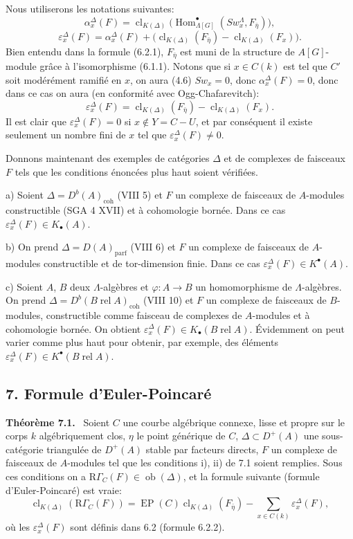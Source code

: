 \documentclass[11pt]{article}
\newenvironment{statement}[1]{\par\medskip\noindent\textbf{#1.}\ }{\par\medskip}
\DeclareMathOperator{\Hom}{Hom}
\providecommand{\EP}{\operatorname{EP}}
\providecommand{\parf}{\mathrm{parf}}
\providecommand{\coh}{\mathrm{coh}}
\providecommand{\Ob}{\operatorname{ob}}
\providecommand{\Hom}{\operatorname{Hom}}
\providecommand{\Ob}{\operatorname{ob}}
\providecommand{\EP}{\operatorname{EP}}
\providecommand{\Ob}{\operatorname{Ob}}
\providecommand{\parf}{\mathrm{parf}}
\providecommand{\coh}{\mathrm{coh}}
\providecommand{\clK}[1]{\operatorname{cl}_{K(#1)}}
\providecommand{\RG}{\mathrm R\Gamma}
\providecommand{\Hom}{\operatorname{Hom}}
\providecommand{\Ob}{\operatorname{ob}}
\providecommand{\Ob}{\operatorname{Ob}}
\begin{document}
Nous utiliserons les notations suivantes:
\[
\alpha_x^\Delta(F)
=
\clK{\Delta}\bigl(\Hom^\bullet_{\Lambda[G]}(Sw_x^\Lambda,F_{\bar\eta})\bigr),
\tag{6.2.1}
\]
\[
\varepsilon_x^\Delta(F)
=
\alpha_x^\Delta(F)+
\bigl(\clK{\Delta}(F_{\bar\eta})-\clK{\Delta}(F_x)\bigr).
\tag{6.2.2}
\]
Bien entendu dans la formule (6.2.1), $F_{\bar\eta}$ est muni de la structure de $A[G]$-module grâce à l'isomorphisme (6.1.1). Notons que si $x\in C(k)$ est tel que $C'$ soit modérément ramifié en $x$, on aura (4.6) $Sw_x=0$, donc $\alpha_x^\Delta(F)=0$, donc dans ce cas on aura (en conformité avec Ogg-Chafarevitch):
\[
\varepsilon_x^\Delta(F)=\clK{\Delta}(F_{\bar\eta})-\clK{\Delta}(F_x).
\tag{6.2.3}
\]
Il est clair que $\varepsilon_x^\Delta(F)=0$ si $x\notin Y=C-U$, et par conséquent il existe seulement un nombre fini de $x$ tel que $\varepsilon_x^\Delta(F)\ne0$.

Donnons maintenant des exemples de catégories $\Delta$ et de complexes de faisceaux $F$ tels que les conditions énoncées plus haut soient vérifiées.

a) Soient $\Delta=D^b(A)_{\coh}$ (VIII 5) et $F$ un complexe de faisceaux de $A$-modules constructible (SGA 4 XVII) et à cohomologie bornée. Dans ce cas $\varepsilon_x^\Delta(F)\in K_\bullet(A)$.

b) On prend $\Delta=D(A)_{\parf}$ (VIII 6) et $F$ un complexe de faisceaux de $A$-modules constructible et de tor-dimension finie. Dans ce cas $\varepsilon_x^\Delta(F)\in K^{\bullet}(A)$.

c) Soient $A$, $B$ deux $\Lambda$-algèbres et $\varphi:A\to B$ un homomorphisme de $\Lambda$-algèbres. On prend $\Delta=D^b(B\operatorname{ rel }A)_{\coh}$ (VIII 10) et $F$ un complexe de faisceaux de $B$-modules, constructible comme faisceau de complexes de $A$-modules et à cohomologie bornée. On obtient $\varepsilon_x^\Delta(F)\in K_\bullet(B\operatorname{ rel }A)$. Évidemment on peut varier comme plus haut pour obtenir, par exemple, des éléments $\varepsilon_x^\Delta(F)\in K^{\bullet}(B\operatorname{ rel }A)$.

\subsection*{7. Formule d'Euler-Poincaré}

\begin{statement}{Théorème 7.1}
Soient $C$ une courbe algébrique connexe, lisse et propre sur le corps $k$ algébriquement clos, $\eta$ le point générique de $C$, $\Delta\subset D^+(A)$ une sous-catégorie triangulée de $D^+(A)$ stable par facteurs directs, $F$ un complexe de faisceaux de $A$-modules tel que les conditions i), ii) de 7.1 soient remplies. Sous ces conditions on a $\RG_C(F)\in\Ob(\Delta)$, et la formule suivante (formule d'Euler-Poincaré) est vraie:
\[
\clK{\Delta}(\RG_C(F))
=
\EP(C)\clK{\Delta}(F_{\bar\eta})
-\sum_{x\in C(k)}\varepsilon_x^\Delta(F),
\tag{7.2}
\]
où les $\varepsilon_x^\Delta(F)$ sont définis dans 6.2 (formule 6.2.2).
\end{statement}
\end{document}
